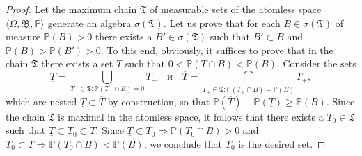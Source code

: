 \begin{proof}
	Let the maximum chain $\mathfrak{T}$ of measurable sets of the atomless space $\langle \Omega, \mathfrak{B}, \mathbb{P} \rangle$ generate an algebra $\sigma(\mathfrak{T})$. Let us prove that for each $B \in \sigma(\mathfrak{T})$ of measure $\mathbb{P}(B) > 0$ there exists a $B' \in \sigma(\mathfrak{T})$ such that $B' \subset B$ and $\mathbb{P}(B) > \mathbb{P}(B') > 0$. To this end, obviously, it suffices to prove that in the chain $\mathfrak{T}$ there exists a set $T$ such that $0 < \mathbb{P}(T \cap B) < \mathbb{P}(B)$. Consider the sets %
	\begin{equation*}
		\underline{T} = \bigcup_{T_- \in \mathfrak{T} : \mathbb{P}(T_- \cap B) = 0} T_- \quad\text{и}\quad \overline{T} = \bigcap_{T_+ \in \mathfrak{T} : \mathbb{P}(T_+ \cap B) = \mathbb{P}(B)} T_+,
	\end{equation*}
	which are nested $\underline{T} \subset \overline{T}$ by construction, so that $\mathbb{P}(\overline{T}) - \mathbb{P}(\underline{T}) \ge \mathbb{P}(B)$. Since the chain $\mathfrak{T}$ is maximal in the atomless space, it follows that there exists a $T_0 \in \mathfrak{T}$ such that $\underline{T} \subset T_0 \subset \overline{T}$. Since $\underline{T} \subset T_0 \Rightarrow \mathbb{P}(T_0 \cap B) > 0$ and $T_0 \subset \overline{T} \Rightarrow \mathbb{P}(T_0 \cap B) < \mathbb{P}(B)$, we conclude that $T_0$ is the desired set. %
\end{proof}

